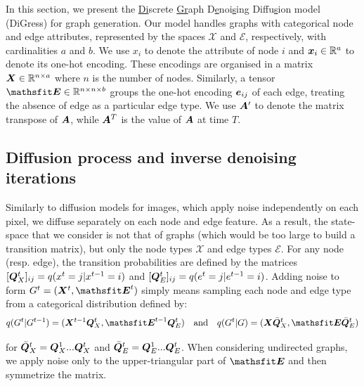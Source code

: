 \documentclass{article} %
\theoremstyle{plain}
\theoremstyle{definition}
\theoremstyle{remark}
\begin{document}
In this section, we present the \underline{Di}screte \underline{Gr}aph D\underline{e}noi\underline{s}ing Diffu\underline{s}ion model (DiGress) for graph generation. Our model handles graphs with categorical node and edge attributes, represented by the spaces $\mathcal{X}$ and $\mathcal{E}$, respectively, with cardinalities $a$ and $b$. We use
$x_i$ to denote the attribute of node $i$ and ${\bm{x}}_i \in \mathbb{R}^a$ to denote its one-hot encoding. 
These encodings are organised in a matrix ${\bm{X}} \in \mathbb{R}^{n \times a}$ where $n$ is the number of nodes. Similarly, a tensor $\tE \in \R^{n \times n \times b}$ groups the one-hot encoding ${\bm{e}}_{ij}$ of each edge, treating the absence of edge as a particular edge type. We use ${\bm{A}}'$ to denote the matrix transpose of ${\bm{A}}$, while ${\bm{A}}^T$ is the value of ${\bm{A}}$ at time $T$.



\subsection{Diffusion process and inverse denoising iterations}

 Similarly to diffusion models for images, which apply noise independently on each pixel, we diffuse separately on each node and edge feature. As a result, the state-space that we consider is not that of graphs (which would be too large to build a transition matrix), but only the node types $\mathcal X$ and edge types $\mathcal E$. For any node (resp. edge), the transition probabilities are defined by the matrices $[{\bm{Q}}^t_X]_{ij} = q(x^t=j | x^{t-1}=i)$ and $[{\bm{Q}}^t_E]_{ij} = q(e^t=j | e^{t-1}=i)$. Adding noise to form $G^t = (\mX^t, \tE^t)$ simply means sampling each node and edge type from a categorical distribution defined by:
\begin{equation}
q(G^t | G^{t-1}) = (\mX^{t-1} \mQ^t_X, \tE^{t-1} \mQ^t_E) \quad \text{and} \quad 
q(G^t | G) = (\mX \bar\mQ^t_X, \tE \bar \mQ^t_E)
\end{equation}

for $\bar{{\bm{Q}}}^t_X = {\bm{Q}}^1_X ... {\bm{Q}}^t_X$ and $\bar{{\bm{Q}}}^t_E = {\bm{Q}}^1_E ... {\bm{Q}}^t_E$. 
When considering undirected graphs, we apply noise only to the upper-triangular part of $\tE$ and then symmetrize the matrix.
\end{document}
